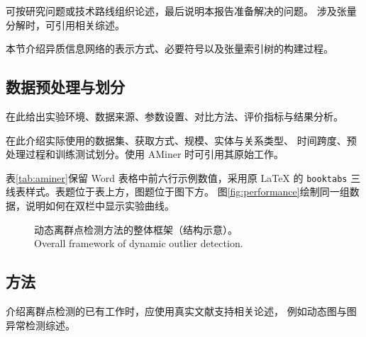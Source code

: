 \documentclass[sigconf,nonacm,screen]{acmart}
\begin{document}
可按研究问题或技术路线组织论述，最后说明本报告准备解决的问题。
涉及张量分解时，可引用相关综述\cite{kolda2009}。

本节介绍异质信息网络的表示方式、必要符号以及张量索引树的构建过程。

\subsection{数据预处理与划分}
\label{sec:task3-preprocess}
在此给出实验环境、数据来源、参数设置、对比方法、评价指标与结果分析。

在此介绍实际使用的数据集、获取方式、规模、实体与关系类型、
时间跨度、预处理过程和训练测试划分。使用 AMiner 时可引用其原始工作\cite{tang2008}。

表\ref{tab:aminer}保留 Word 表格中前六行示例数值，采用原 LaTeX
的 \texttt{booktabs} 三线表样式。表题位于表上方，图题位于图下方。
图\ref{fig:performance}绘制同一组数据，说明如何在双栏中显示实验曲线。

\begin{figure}[t]
  \centering
  \caption{动态离群点检测方法的整体框架（结构示意）。\\Overall framework of dynamic outlier detection.}
  \label{fig:framework}
\end{figure}

\subsection{方法}
\label{sec:task3-method}
介绍离群点检测的已有工作时，应使用真实文献支持相关论述，
例如动态图与图异常检测综述\cite{akoglu2015}。
\end{document}
